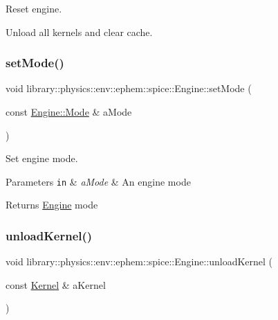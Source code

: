 Reset engine. 

Unload all kernels and clear cache. \mbox{\label{classlibrary_1_1physics_1_1env_1_1ephem_1_1spice_1_1_engine_a0e4ba12bfad03f16aa64cdcc352ad777}} 
\subsubsection{\texorpdfstring{set\+Mode()}{setMode()}}
{\footnotesize\ttfamily void library\+::physics\+::env\+::ephem\+::spice\+::\+Engine\+::set\+Mode (\begin{DoxyParamCaption}\item[{const \hyperlink{classlibrary_1_1physics_1_1env_1_1ephem_1_1spice_1_1_engine_a2d185a63bce354bff9ad38810410eab4}{Engine\+::\+Mode} \&}]{a\+Mode }\end{DoxyParamCaption})}



Set engine mode. 


\begin{DoxyParams}[1]{Parameters}
\mbox{\tt in}  & {\em a\+Mode} & An engine mode \\
\hline
\end{DoxyParams}
\begin{DoxyReturn}{Returns}
\hyperlink{classlibrary_1_1physics_1_1env_1_1ephem_1_1spice_1_1_engine}{Engine} mode 
\end{DoxyReturn}
\mbox{\label{classlibrary_1_1physics_1_1env_1_1ephem_1_1spice_1_1_engine_a00f5e8f4ad56ce48cf291b3a3356970f}} 
\subsubsection{\texorpdfstring{unload\+Kernel()}{unloadKernel()}}
{\footnotesize\ttfamily void library\+::physics\+::env\+::ephem\+::spice\+::\+Engine\+::unload\+Kernel (\begin{DoxyParamCaption}\item[{const \hyperlink{classlibrary_1_1physics_1_1env_1_1ephem_1_1spice_1_1_kernel}{Kernel} \&}]{a\+Kernel }\end{DoxyParamCaption})}



